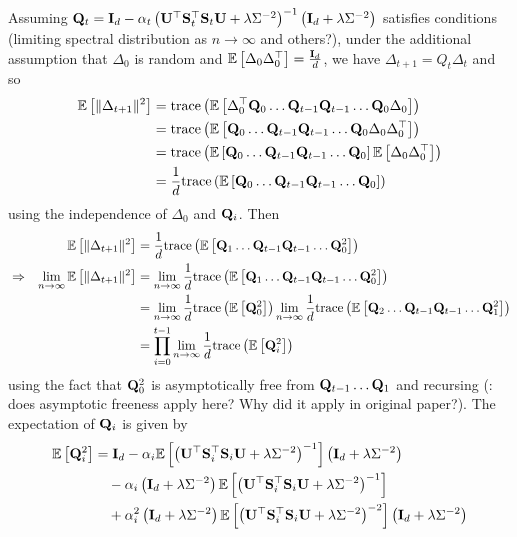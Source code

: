 \documentclass[10pt]{article}
\begin{document}
\todo Assuming $\mathbf{Q}_t=\mathbf{I}_d - \alpha_t\left(\mathbf{U}^\top\mathbf{S}_t^\top\mathbf{S}_t\mathbf{U} + \lambda\Sigma^{-2}\right)^{-1}\left(\mathbf{I}_d + \lambda\Sigma^{-2}\right)$ satisfies conditions (limiting spectral distribution as $n\rightarrow\infty$ and others?), under the additional assumption that $\Delta_0$ is random and $\mathbb{E}\left[\Delta_0\Delta_0^\top\right]=\frac{\mathbf{I}_d}{d}$, we have $\Delta_{t+1}=Q_t\Delta_t$ and so
\begin{align*}
\mathbb{E}\left[\|\Delta_{t+1}\|^2\right] &= \mathrm{trace}\left(\mathbb{E}\left[\Delta_0^\top\mathbf{Q}_0\ldots \mathbf{Q}_{t-1}\mathbf{Q}_{t-1}\ldots\mathbf{Q}_0\Delta_0\right]\right) \\
&= \mathrm{trace}\left(\mathbb{E}\left[\mathbf{Q}_0\ldots \mathbf{Q}_{t-1}\mathbf{Q}_{t-1}\ldots\mathbf{Q}_0\Delta_0\Delta_0^\top\right]\right) \\
&= \mathrm{trace}\left(\mathbb{E}\left[\mathbf{Q}_0\ldots \mathbf{Q}_{t-1}\mathbf{Q}_{t-1}\ldots\mathbf{Q}_0\right]\mathbb{E}\left[\Delta_0\Delta_0^\top\right]\right) \\
&= \frac{1}{d}\mathrm{trace}\left(\mathbb{E}\left[\mathbf{Q}_0\ldots \mathbf{Q}_{t-1}\mathbf{Q}_{t-1}\ldots\mathbf{Q}_0\right]\right)
\end{align*}
using the independence of $\Delta_0$ and $\mathbf{Q}_i$. Then
\begin{align*}
&& \mathbb{E}\left[\|\Delta_{t+1}\|^2\right] &= \frac{1}{d}\mathrm{trace}\left(\mathbb{E}\left[\mathbf{Q}_1\ldots \mathbf{Q}_{t-1}\mathbf{Q}_{t-1}\ldots\mathbf{Q}_0^2\right]\right) \\
&\Rightarrow & \lim_{n\rightarrow\infty}\mathbb{E}\left[\|\Delta_{t+1}\|^2\right] &= \lim_{n\rightarrow\infty}\frac{1}{d}\mathrm{trace}\left(\mathbb{E}\left[\mathbf{Q}_1\ldots \mathbf{Q}_{t-1}\mathbf{Q}_{t-1}\ldots\mathbf{Q}_0^2\right]\right) \\
&& &= \lim_{n\rightarrow\infty}\frac{1}{d}\mathrm{trace}\left(\mathbb{E}\left[\mathbf{Q}_0^2\right]\right)\lim_{n\rightarrow\infty}\frac{1}{d}\mathrm{trace}\left(\mathbb{E}\left[\mathbf{Q}_2\ldots \mathbf{Q}_{t-1}\mathbf{Q}_{t-1}\ldots\mathbf{Q}_1^2\right]\right) \\
&&&= \prod_{i=0}^{t-1}\lim_{n\rightarrow\infty}\frac{1}{d}\mathrm{trace}\left(\mathbb{E}\left[\mathbf{Q}_i^2\right]\right)
\end{align*}
using the fact that $\mathbf{Q}_0^2$ is asymptotically free from $\mathbf{Q}_{t-1}\ldots\mathbf{Q}_1$ and recursing (\todo: does asymptotic freeness apply here? Why did it apply in original paper?). The expectation of $\mathbf{Q}_i$ is given by
\begin{align*}
\mathbb{E}\left[\mathbf{Q}_i^2\right] &= \mathbf{I}_d - \alpha_i\mathbb{E}\left[\left(\mathbf{U}^\top\mathbf{S}_i^\top\mathbf{S}_i\mathbf{U} + \lambda\Sigma^{-2}\right)^{-1}\right]\left(\mathbf{I}_d + \lambda\Sigma^{-2}\right) \\
&\quad - \alpha_i\left(\mathbf{I}_d + \lambda\Sigma^{-2}\right)\mathbb{E}\left[\left(\mathbf{U}^\top\mathbf{S}_i^\top\mathbf{S}_i\mathbf{U} + \lambda\Sigma^{-2}\right)^{-1}\right] \\
&\quad + \alpha_i^2\left(\mathbf{I}_d + \lambda\Sigma^{-2}\right)\mathbb{E}\left[\left(\mathbf{U}^\top\mathbf{S}_i^\top\mathbf{S}_i\mathbf{U} + \lambda\Sigma^{-2}\right)^{-2}\right]\left(\mathbf{I}_d + \lambda\Sigma^{-2}\right)
\end{align*}
\end{document}
